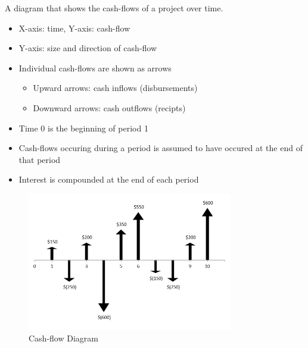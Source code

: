 \begin{definition}
    A diagram that shows the cash-flows of a project over time.
    \begin{itemize}
        \item X-axis: time, Y-axis: cash-flow
        \item Y-axis: size and direction of cash-flow
        \item Individual cash-flows are shown as arrows
              \begin{itemize}
                  \item Upward arrows: cash inflows (disbursements)
                  \item Downward arrows: cash outflows (recipts)
              \end{itemize}
        \item Time 0 is the beginning of period 1
        \item Cash-flows occuring during a period is assumed to have occured at the end of that period
        \item Interest is compounded at the end of each period
    \end{itemize}
\end{definition}
\begin{figure}[H]
    \centering
    \includegraphics[width=0.8\textwidth]{LECTURE_2/cash-flow-diagram.png}
    \caption{Cash-flow Diagram}
    \label{fig:cash-flow_diagram}
\end{figure}

